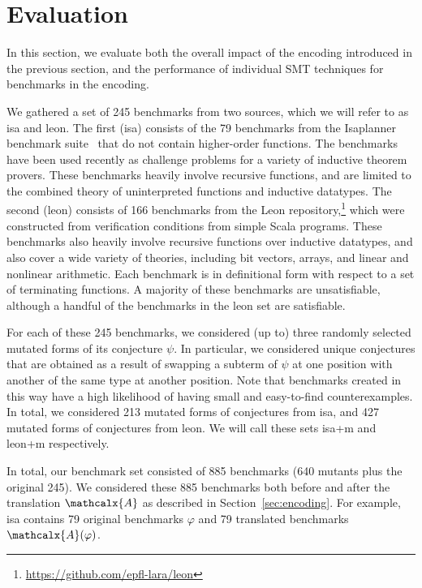 \documentclass[runningheads,a4paper]{llncs}
\newcommand\bench{\ttfamily}
\newcommand{\conv}{\mathcalx{A}}
\begin{document}
\section{Evaluation}
\label{sec:evaluation}

In this section, we evaluate both the overall impact of the encoding introduced
in the previous section, and the performance of individual SMT techniques for
benchmarks in the encoding.

We gathered a set of 245 benchmarks from two sources, which we will refer to as
{\bench isa} and {\bench leon}. The first ({\bench isa}) consists of the 79
benchmarks from the Isaplanner benchmark
suite~\cite{DBLP:conf/itp/JohanssonDB10} that do not contain higher-order
functions. The benchmarks have been used recently as challenge problems for a
variety of inductive theorem provers. These benchmarks heavily involve
recursive functions, and are limited to the combined theory of uninterpreted
functions and inductive datatypes. The second ({\bench leon}) consists of 166
benchmarks from the Leon repository,\footnote{%
\url{https://github.com/epfl-lara/leon}} which were constructed from
verification conditions from simple Scala programs. These benchmarks also
heavily involve recursive functions over inductive datatypes, and also cover a
wide variety of theories, including bit vectors, arrays, and linear and
nonlinear arithmetic. Each benchmark is in definitional form with respect to a
set of terminating functions.
%
A majority of these benchmarks are unsatisfiable, although a
handful of the benchmarks in the {\bench leon} set are satisfiable.

For each of these 245 benchmarks, we considered (up to) three randomly selected mutated forms of its conjecture $\psi$.
In particular, we considered unique conjectures that are obtained as a result of swapping a subterm of $\psi$ at one position
with another of the same type at another position.
Note that benchmarks created in this way have a high likelihood of having small and easy-to-find counterexamples.
In total, we considered 213 mutated forms of conjectures from {\bench isa}, and 427 mutated forms of conjectures from {\bench leon}.
We will call these sets {\bench isa+m} and {\bench leon+m} respectively.

In total, our benchmark set consisted of 885 benchmarks (640 mutants plus the original 245).
We considered these 885 benchmarks both before and after the translation $\conv$ as described in Section~\ref{sec:encoding}.
For example, {\bench isa} contains 79 original benchmarks $\varphi$
and 79 translated benchmarks $\conv(\varphi)$.
\end{document}
